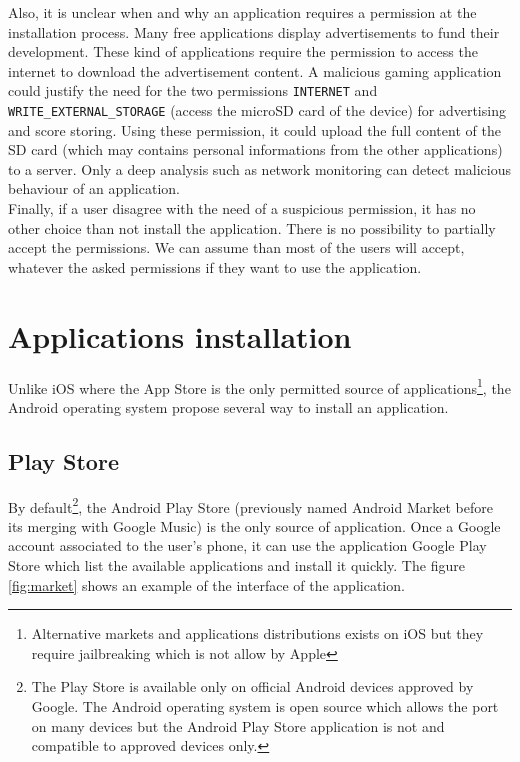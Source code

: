 Also, it is unclear when and why an application requires a permission at the installation process.
Many free applications display advertisements to fund their development.
These kind of applications require the permission to access the internet to download the advertisement content.
A malicious gaming application could justify the need for the two permissions \texttt{INTERNET} and \texttt{WRITE\_EXTERNAL\_STORAGE} (access the microSD card of the device) for advertising and score storing. Using these permission, it could upload the full content of the SD card (which may contains personal informations from the other applications) to a server.
Only a deep analysis such as network monitoring can detect malicious behaviour of an application.\\

Finally, if a user disagree with the need of a suspicious permission, it has no other choice than not install the application.
There is no possibility to partially accept the permissions.
We can assume than most of the users will accept, whatever the asked permissions if they want to use the application.

\section{Applications installation}

Unlike iOS where the App Store is the only permitted source of applications\footnote{Alternative markets and applications distributions exists on iOS but they require jailbreaking which is not allow by Apple}, the Android operating system propose several way to install an application.

\subsection{Play Store}
By default\footnote{The Play Store is available only on official Android devices approved by Google. The Android operating system is open source which allows the port on many devices but the Android Play Store application is not and compatible to approved devices only.}, the Android Play Store (previously named Android Market before its merging with Google Music) is the only source of application.
Once a Google account associated to the user's phone, it can use the application Google Play Store which list the available applications and install it quickly.
The figure \ref{fig:market} shows an example of the interface of the application.\\

